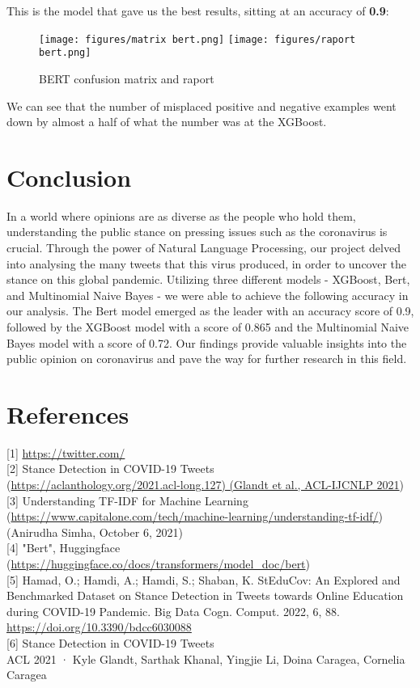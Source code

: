 \documentclass[11pt, a4paper]{article}
\begin{document}
\begin{large}
This is the model that gave us the best results, sitting at an accuracy of \textbf{0.9}:
\begin{figure}[H]
    \centering
    \texttt{[image: figures/matrix bert.png]}
    \texttt{[image: figures/raport bert.png]}
    \caption{BERT confusion matrix and raport}
    \label{fig:enter-label}
\end{figure}

We can see that the number of misplaced positive and negative examples went down by almost a half of what the number was at the XGBoost.


\section{Conclusion}
In a world where opinions are as diverse as the people who hold them, understanding the public stance on pressing issues such as the coronavirus is crucial. Through the power of Natural Language Processing, our project delved into analysing the many tweets that this virus produced, in order to uncover the stance on this global pandemic. Utilizing three different models - XGBoost, Bert, and Multinomial Naive Bayes - we were able to achieve the following accuracy in our analysis. The Bert model emerged as the leader with an accuracy score of 0.9, followed by the XGBoost model with a score of 0.865 and the Multinomial Naive Bayes model with a score of 0.72. Our findings provide valuable insights into the public opinion on coronavirus and pave the way for further research in this field.

\newpage

\section{References}

[1] \url{https://twitter.com/}\\

[2] Stance Detection in COVID-19 Tweets \\(\url{https://aclanthology.org/2021.acl-long.127) (Glandt et al., ACL-IJCNLP 2021})\\

[3] Understanding TF-IDF for Machine Learning (\url{https://www.capitalone.com/tech/machine-learning/understanding-tf-idf/}) (Anirudha Simha, October 6, 2021)\\

[4] "Bert", Huggingface (\url{https://huggingface.co/docs/transformers/model_doc/bert})\\

[5] Hamad, O.; Hamdi, A.; Hamdi, S.; Shaban, K. StEduCov: An Explored and Benchmarked Dataset on Stance Detection in Tweets towards Online Education during COVID-19 Pandemic. Big Data Cogn. Comput. 2022, 6, 88. \url{https://doi.org/10.3390/bdcc6030088} \\

[6] Stance Detection in COVID-19 Tweets\\
ACL 2021  ·  Kyle Glandt, Sarthak Khanal, Yingjie Li, Doina Caragea, Cornelia Caragea
\end{large}
\end{document}
